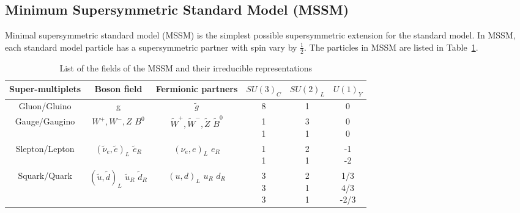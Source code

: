 \clearpage
\subsection{Minimum Supersymmetric Standard Model (MSSM)}

Minimal supersymmetric standard model (MSSM) is the simplest possible supersymmetric extension for the standard model. In MSSM, each standard model particle has a supersymmetric partner with spin vary by $\frac{1}{2}$. The particles in MSSM are listed in Table~\ref{tab:c2mssmf}.

\begin{table}[htbp]
\fontsize{10 pt}{1.2 em}
\selectfont
\begin{centering}
\caption{\label{tab:c2mssmf}List of the fields of the MSSM and their irreducible representations}
\hspace*{-4ex}
\begin{tabular}{|c|c|c|c|c|c|}
\hline
Super-multiplets & Boson field & Fermionic partners & $SU(3)_{C}$ & $SU(2)_{L}$ & $U(1)_{Y}$ \\
\hline
Gluon/Gluino     & g & $\tilde{g}$ & 8 & 1 & 0 \\
\hline
Gauge/Gaugino    & \specialcell{$W^{+},W^{-},Z$ \\ $B^{0}$} & \specialcell{$\tilde{W}^{+},\tilde{W}^{-},\tilde{Z}$ \\ $\tilde{B}^{0}$} & \specialcell{1 \\ 1} & \specialcell{3 \\ 1} & \specialcell{0 \\ 0} \\
\hline
Slepton/Lepton   & \specialcell{$(\tilde{\nu}_{e},\tilde{e})_{L}$ \\ $\tilde{e}_{R}$} & \specialcell{$(\nu_{e},e)_{L}$ \\ $e_{R}$} & \specialcell{1 \\ 1} & \specialcell{2 \\ 1} & \specialcell{-1 \\ -2} \\
\hline
Squark/Quark     & \specialcell{$(\tilde{u},\tilde{d})_{L}$ \\ $\tilde{u}_{R}$ \\ $\tilde{d}_{R}$} & \specialcell{$(u,d)_{L}$ \\ $u_{R}$ \\ $d_{R}$} & \specialcell{3 \\ 3 \\ 3} & \specialcell{2 \\ 1 \\ 1} & \specialcell{1/3 \\ 4/3 \\ -2/3} \\

\end{tabular}
\end{centering}
\end{table}
